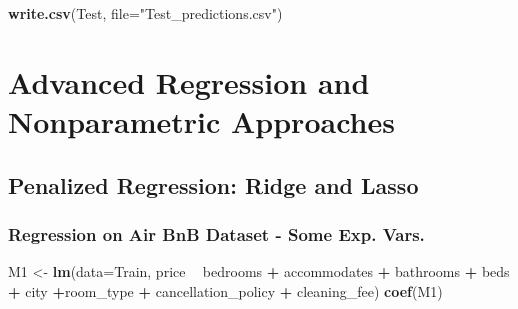 \documentclass[]{book}
\newenvironment{Shaded}{\begin{snugshade}}{\end{snugshade}}
\newcommand{\KeywordTok}[1]{\textcolor[rgb]{0.13,0.29,0.53}{\textbf{#1}}}
\newcommand{\DataTypeTok}[1]{\textcolor[rgb]{0.13,0.29,0.53}{#1}}
\newcommand{\StringTok}[1]{\textcolor[rgb]{0.31,0.60,0.02}{#1}}
\newcommand{\OperatorTok}[1]{\textcolor[rgb]{0.81,0.36,0.00}{\textbf{#1}}}
\newcommand{\NormalTok}[1]{#1}
\begin{document}
\begin{Shaded}
\end{Shaded}

\begin{Shaded}
\begin{Highlighting}[]
\KeywordTok{write.csv}\NormalTok{(Test, }\DataTypeTok{file=}\StringTok{"Test_predictions.csv"}\NormalTok{)}
\end{Highlighting}
\end{Shaded}

\chapter{Advanced Regression and Nonparametric
Approaches}\label{advanced-regression-and-nonparametric-approaches}

\section{Penalized Regression: Ridge and
Lasso}\label{penalized-regression-ridge-and-lasso}

\subsection{Regression on Air BnB Dataset - Some Exp.
Vars.}\label{regression-on-air-bnb-dataset---some-exp.-vars.}

\begin{Shaded}
\begin{Highlighting}[]
\NormalTok{M1 <-}\StringTok{ }\KeywordTok{lm}\NormalTok{(}\DataTypeTok{data=}\NormalTok{Train, price }\OperatorTok{~}\StringTok{ }\NormalTok{bedrooms }\OperatorTok{+}\StringTok{ }\NormalTok{accommodates }\OperatorTok{+}\StringTok{ }\NormalTok{bathrooms }\OperatorTok{+}\StringTok{ }\NormalTok{beds }\OperatorTok{+}\StringTok{ }
\StringTok{           }\NormalTok{city }\OperatorTok{+}\NormalTok{room_type }\OperatorTok{+}\StringTok{ }\NormalTok{cancellation_policy }\OperatorTok{+}\StringTok{ }\NormalTok{cleaning_fee)}
\KeywordTok{coef}\NormalTok{(M1)}
\end{Highlighting}
\end{Shaded}
\end{document}
